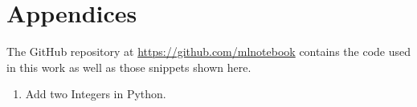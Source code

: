 \chapter*{Appendices}

\begin{cabstract}
The GitHub repository at \url{https://github.com/mlnotebook} contains the code used in this work as well as those snippets shown here.
\end{cabstract}

\begin{enumerate}[wide, labelindent=1cm, label=\textbf{Listing \arabic*:}]
\itemsep0.4cm 
\item Add two Integers in Python.
\end{enumerate}

\vspace*{\fill}
\clearpage

